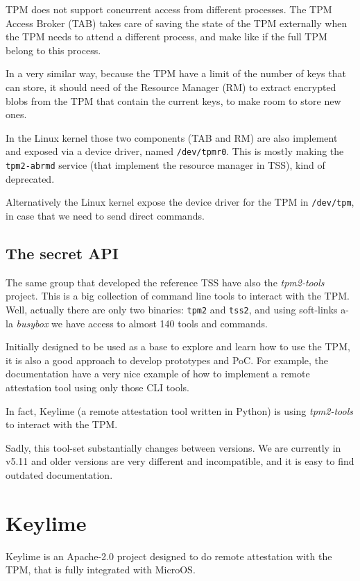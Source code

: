 \documentclass{article}
\begin{document}
TPM does not support concurrent access from different processes.  The
TPM Access Broker (TAB) takes care of saving the state of the TPM
externally when the TPM needs to attend a different process, and make
like if the full TPM belong to this process.

In a very similar way, because the TPM have a limit of the number of
keys that can store, it should need of the Resource Manager (RM) to
extract encrypted blobs from the TPM that contain the current keys, to
make room to store new ones.

In the Linux kernel those two components (TAB and RM) are also
implement and exposed via a device driver, named \texttt{/dev/tpmr0}.
This is mostly making the \texttt{tpm2-abrmd} service (that implement
the resource manager in TSS), kind of deprecated.

Alternatively the Linux kernel expose the device driver for the TPM in
\texttt{/dev/tpm}, in case that we need to send direct commands.

\subsection{The secret API}
The same group that developed the reference TSS have also the
\emph{tpm2-tools} project.  This is a big collection of command line
tools to interact with the TPM. Well, actually there are only two
binaries: \texttt{tpm2} and \texttt{tss2}, and using soft-links a-la
\emph{busybox} we have access to almost 140 tools and commands.

Initially designed to be used as a base to explore and learn how to
use the TPM, it is also a good approach to develop prototypes and PoC.
For example, the documentation have a very nice example of how to
implement a remote attestation tool using only those CLI
tools\cite{tpm2toolsra}.

In fact, Keylime (a remote attestation tool written in Python) is
using \emph{tpm2-tools} to interact with the TPM.

Sadly, this tool-set substantially changes between versions.  We are
currently in v5.11 and older versions are very different and
incompatible, and it is easy to find outdated documentation.

\section{Keylime}
Keylime\cite{keylime} is an Apache-2.0 project designed to do remote
attestation with the TPM, that is fully integrated with MicroOS.
\end{document}
